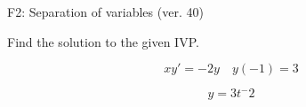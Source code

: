 \begin{exercise}
  \begin{exerciseTitle}F2: Separation of variables (ver. 40)\end{exerciseTitle}
  \begin{exerciseStatement}
    
Find the solution to the given IVP.

    
\[xy'= -2 y \hspace{1em} y( -1 ) = 3\]

  \end{exerciseStatement}
  \begin{exerciseAnswer}
    
\[y= 3 t^ -2\]

  \end{exerciseAnswer}
\end{exercise}